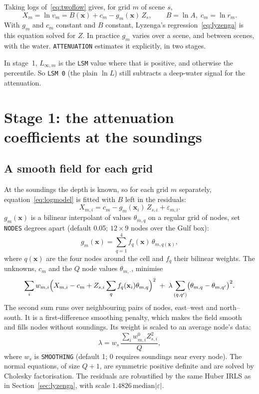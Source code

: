 \documentclass[11pt]{article}
\numberwithin{equation}{section}
\newcommand{\bx}{\mathbf{x}}
\newcommand{\code}[1]{\texttt{#1}}
\newcommand{\Lsm}[1]{L_{\infty,#1}}
\begin{document}
Taking logs of~\eqref{eq:twoflow} gives, for grid $m$ of scene $s$,
\begin{equation}
  X_m = \ln v_m = B(\bx) + c_m - g_m(\bx)\, Z_s ,
  \qquad B = \ln A, \; c_m = \ln r_m .
  \label{eq:logmodel}
\end{equation}
With $g_m$ and $c_m$ constant and $B$ constant, Lyzenga's regression~\eqref{eq:lyzenga} is this
equation solved for $Z$. In practice $g_m$ varies over a scene, and between scenes, with the
water. \code{ATTENUATION} estimates it explicitly, in two stages.

In stage~1, $\Lsm{m}$ is the \code{LSM} value where that is positive, and otherwise the
percentile. So \code{LSM 0} (the plain $\ln L$) still subtracts a deep-water signal for
the attenuation.

\section{Stage 1: the attenuation coefficients at the soundings}
\label{sec:stage1}

\subsection{A smooth field for each grid}

At the soundings the depth is known, so for each grid $m$ separately, equation~\eqref{eq:logmodel}
is fitted with $B$ left in the residuals:
\begin{equation}
  X_{m,i} = c_m - g_m(\bx_i)\, Z_{s,i} + \varepsilon_{m,i}.
  \label{eq:stage1}
\end{equation}
$g_m(\bx)$ is a bilinear interpolant of values $\theta_{m,q}$ on a regular grid of nodes, set
\code{NODES} degrees apart (default 0.05\textdegree; $12\times9$ nodes over the Gulf box):
\begin{equation}
  g_m(\bx) = \sum_{q=1}^{4} f_q(\bx)\, \theta_{m,q(\bx)} ,
\end{equation}
where $q(\bx)$ are the four nodes around the cell and $f_q$ their bilinear weights. The unknowns,
$c_m$ and the $Q$ node values $\theta_{m,\cdot}$, minimise
\begin{equation}
  \sum_{i} w_{m,i}\Bigl(X_{m,i} - c_m + Z_{s,i}\sum_q f_q(\bx_i)\theta_{m,q}\Bigr)^2
  \;+\; \lambda \sum_{(q,q')} \bigl(\theta_{m,q} - \theta_{m,q'}\bigr)^2 .
  \label{eq:stage1_obj}
\end{equation}
The second sum runs over neighbouring pairs of nodes, east--west and north--south. It is a
first-difference smoothing penalty, which makes the field smooth and fills nodes without
soundings. Its weight is scaled to an average node's data:
\begin{equation}
  \lambda = w_s \,\frac{\sum_i w^{0}_{m,i} Z_{s,i}^2}{Q},
\end{equation}
where $w_s$ is \code{SMOOTHING} (default 1; 0 requires soundings near every node). The normal
equations, of size $Q + 1$, are symmetric positive definite and are solved by Cholesky
factorisation. The residuals are robustified by the same Huber IRLS as in
Section~\ref{sec:lyzenga}, with scale $1.4826\,\mathrm{median}|\varepsilon|$.
\end{document}
